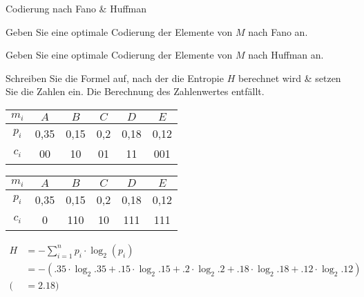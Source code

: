 \documentclass{exercisesheet}
\begin{document}
  \begin{exercise}{Codierung nach Fano \& Huffman}
    \item Geben Sie eine optimale Codierung der Elemente von $M$ nach Fano an.
    \item Geben Sie eine optimale Codierung der Elemente von $M$ nach Huffman an.
    \item Schreiben Sie die Formel auf, nach der die Entropie $H$ berechnet wird \& setzen Sie die Zahlen ein. Die Berechnung des Zahlenwertes entfällt.
  \end{exercise}

  \begin{solution}
    \item
      \begin{tabular}{c|ccccc}
        $m_i$ & $A$ & $B$ & $C$ & $D$ & $E$\\
        \hline
        $p_i$ & 0,35 & 0,15 & 0,2 & 0,18 & 0,12\\
        $c_i$ & 00 & 10 & 01 & 11 & 001\\
      \end{tabular}
    \item
      \begin{tabular}{c|ccccc}
        $m_i$ & $A$ & $B$ & $C$ & $D$ & $E$\\
        \hline
        $p_i$ & 0,35 & 0,15 & 0,2 & 0,18 & 0,12\\
        $c_i$ & 0 & 110 & 10 & 111 & 111\\
      \end{tabular}
    \item
      \begin{equation*}
        \begin{split}
          H &= -\sum_{i=1}^{n} p_i \cdot \log_2(p_i)\\
          &= -(.35\cdot \log_2{.35}+ .15\cdot \log_2{.15}+ .2\cdot \log_2{.2}+ .18\cdot \log_2{.18}+ .12\cdot \log_2{.12})\\
          (&=2.18)
        \end{split}
      \end{equation*}
  \end{solution}
\end{document}
